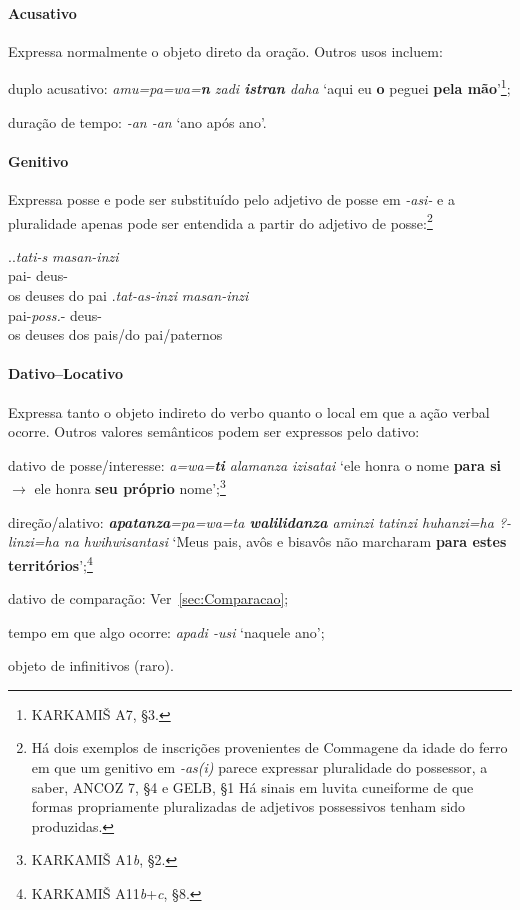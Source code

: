 \documentclass{luvita}
\begin{document}
\paragraph{Acusativo}
Expressa normalmente o objeto direto da oração.
Outros usos incluem:
\begin{inparaenum}[(a)]
	\item duplo acusativo:
	\emph{amu=pa=wa=\textbf{n} zadi \textbf{istran} daha}
	`aqui eu \textbf{o} peguei \textbf{pela mão}'\footnote{KARKAMIŠ A7, §3.};
	\item duração de tempo: \emph{-an -an} `ano após
	ano'.
\end{inparaenum}


\paragraph{Genitivo}
Expressa posse e pode ser substituído pelo adjetivo de posse em \emph{-asi-} e a
pluralidade apenas pode ser entendida a partir do adjetivo de posse:\footnote{
Há dois exemplos de inscrições provenientes de Commagene da idade do ferro em
que um genitivo em \emph{-as{(i)}} parece expressar pluralidade do possessor,
a saber, ANCOZ 7, §4 e GELB, §1
Há sinais em luvita cuneiforme de que formas
propriamente pluralizadas de adjetivos possessivos tenham sido
produzidas.
}

\ex.\ag.\emph{tati-s} \emph{masan-inzi}\\
pai-\Gen\Sg\Com{} deus-\Nom\Pl\Com{}\\
os deuses do pai
\bg.\emph{tat-as-inzi} \emph{masan-inzi}\\
pai-\emph{poss.}-\Nom\Pl\Com{} deus-\Nom\Pl\Com{}\\
os deuses dos pais\slash{}do pai\slash{}paternos


\paragraph{Dativo--Locativo}
Expressa tanto o objeto indireto do verbo quanto o local em que a ação verbal
ocorre. Outros valores semânticos podem ser expressos pelo dativo:
\begin{inparaenum}[(a)]
	\item dativo de posse\slash{}interesse:
	\emph{a=wa=\textbf{ti} alamanza izisatai}
	`ele
	honra o nome \textbf{para si} $\rightarrow$ ele honra \textbf{seu próprio}
	nome';\footnote{KARKAMIŠ A1\emph{b}, §2.}
	\item  direção\slash{}alativo:
	\emph{\textbf{apatanza}=pa=wa=ta \textbf{walilidanza} aminzi tatinzi
	huhanzi=ha {?}-linzi=ha na hwi\-hwisantasi}
	`Meus pais, avôs e bisavôs não marcharam \textbf{para estes
		territórios}';\footnote{KARKAMIŠ A11\emph{b}+\emph{c}, §8.}
	\item dativo de comparação: Ver~\autoref{sec:Comparacao};
	\item tempo em que algo ocorre: \emph{apa\-di -usi} `naquele ano';
	\item objeto de infinitivos (raro).
\end{inparaenum}
\end{document}

